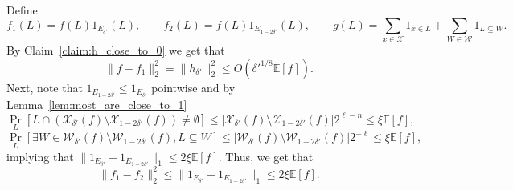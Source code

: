 \documentclass[11pt]{article}
\newcommand\E{\mathbb{E}}
\newcommand\card[1]{\left| {#1} \right|}
\newcommand\Prob[2]{{\Pr_{#1}\left[ {#2} \right]}}
\newcommand\norm[1]{\| #1 \|}
\newcommand\Expect[2]{{\mathop{\mathbb{E}}_{#1}\left[ {#2} \right]}}
\renewcommand\geq{\geqslant}
\renewcommand\leq{\leqslant}
\begin{document}
Define 
\[
f_1(L) = f(L) 1_{E_{\delta'}}(L),
\qquad
f_2(L) = f(L) 1_{E_{1-2\delta'}}(L),
\qquad g(L) = \sum\limits_{x\in\mathcal{X}} 1_{x\in L}+\sum\limits_{W\in\mathcal{W}} 1_{L\subseteq W}.
\]
By Claim~\ref{claim:h_close_to_0} we get that
\begin{equation}\label{eq:3}
  \norm{f-f_1}_2^2 = \norm{h_{\delta'}}_2^2
  \leq O(\delta'^{1/8}\E[f]).
\end{equation}
Next, note that $1_{E_{1-2\delta'}}\leq 1_{E_{\delta'}}$ pointwise and by Lemma~\ref{lem:most_are_close_to_1}
\[
\Prob{L}{L\cap (\mathcal{X}_{\delta'}(f)
\setminus 
\mathcal{X}_{1-2\delta'}(f))\neq \emptyset}
\leq 
\card{\mathcal{X}_{\delta'}(f)
\setminus 
\mathcal{X}_{1-2\delta'}(f)}2^{\ell-n}\leq \xi \E[f],
\]
\[
\Prob{L}{\exists W\in\mathcal{W}_{\delta'}(f)
\setminus 
\mathcal{W}_{1-2\delta'}(f),  L\subseteq W}
\leq 
\card{\mathcal{W}_{\delta'}(f)
\setminus 
\mathcal{W}_{1-2\delta'}(f)}2^{-\ell}\leq \xi \E[f],
\]
implying that $\norm{1_{E_{\delta'}}-1_{E_{1-2\delta'}}}_1\leq 2\xi\E[f]$. Thus, we get that
\begin{equation}\label{eq:4}
  \norm{f_1-f_2}_2^2 
  \leq \norm{1_{E_{\delta'}}-1_{E_{1-2\delta'}}}_1
  \leq 2\xi\E[f].
\end{equation}
\end{document}
